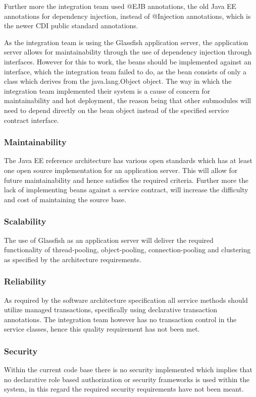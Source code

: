 \documentclass[a4paper,10pt]{article}
\begin{document}
Further more the integration team used @EJB annotations, the old Java EE annotations for dependency injection, instead of @Injection annotations, which is the newer CDI public standard annotations.

As the integration team is using the Glassfish application server, the application server allows for maintainability through the use of dependency injection through interfaces.  However for this to work, the beans should be implemented against an interface, which the integration team failed to do, as the bean consists of only a class which derives from the java.lang.Object object. The way in which the integration team implemented their system is a cause of concern for maintainability and hot deployment, the reason being that other submodules will need to depend directly on the bean object instead of the specified service contract interface.

\subsubsection{Maintainability}
The Java EE reference architecture has various open standards which has at least one open source implementation for an application server. This will allow for future maintainability and hence satisfies the required criteria.  Further more the lack of implementing beans against a service contract, will increase the difficulty and cost of maintaining the source base.

\subsubsection{Scalability}
The use of Glassfish as an application server will deliver the required functionality of thread-pooling, object-pooling, connection-pooling and clustering as specified by the architecture requirements.

\subsubsection{Reliability}
As required by the software architecture specification all service methods should utilize managed transactions, specifically using declarative transaction annotations. The integration team however has no transaction control in the service classes, hence this quality requirement has not been met.

\subsubsection{Security}
Within the current code base there is no security implemented which implies that no declarative role based authorization or security frameworks is used within the system, in this regard the required security requirements have not been meant.
\end{document}
